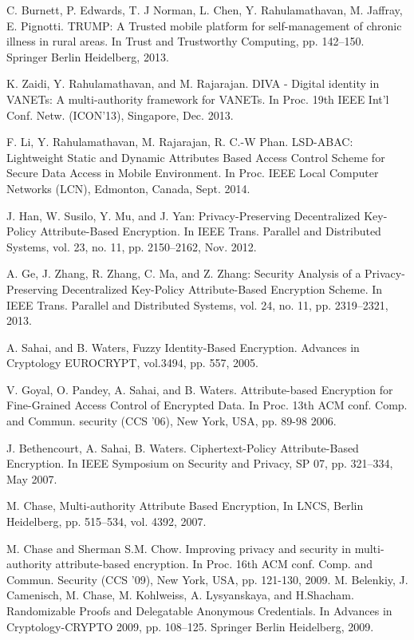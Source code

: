 \documentclass[10pt,journal]{IEEEtran}
\begin{document}
\begin{thebibliography}{5}
C. Burnett, P. Edwards, T. J Norman, L. Chen, Y. Rahulamathavan, M. Jaffray, E. Pignotti. TRUMP: A Trusted mobile platform for self-management of chronic illness in rural areas. In Trust and Trustworthy Computing, pp. 142--150. Springer Berlin Heidelberg, 2013.

K. Zaidi, Y. Rahulamathavan, and M. Rajarajan. DIVA - Digital identity in VANETs: A multi-authority framework for VANETs. In Proc.  19th IEEE Int'l Conf. Netw. (ICON'13), Singapore, Dec. 2013.

F. Li, Y. Rahulamathavan, M. Rajarajan, R. C.-W Phan. LSD-ABAC: Lightweight Static and Dynamic Attributes Based Access Control Scheme for Secure Data Access in Mobile Environment. In Proc. IEEE Local Computer Networks (LCN), Edmonton, Canada, Sept. 2014.




J. Han, W. Susilo, Y. Mu, and J. Yan: Privacy-Preserving Decentralized Key-Policy Attribute-Based Encryption. In IEEE Trans. Parallel and Distributed Systems, vol. 23, no. 11, pp. 2150--2162, Nov. 2012.

A. Ge, J. Zhang, R. Zhang, C. Ma, and Z. Zhang: Security Analysis of a Privacy-Preserving Decentralized Key-Policy Attribute-Based Encryption Scheme. In IEEE Trans. Parallel and Distributed Systems, vol. 24, no. 11, pp. 2319--2321, 2013.



A. Sahai, and B. Waters, Fuzzy Identity-Based Encryption. Advances in Cryptology EUROCRYPT,  vol.3494, pp. 557, 2005.

V. Goyal, O. Pandey, A. Sahai, and B. Waters. Attribute-based Encryption for Fine-Grained Access Control of Encrypted Data. In Proc. 13th ACM conf. Comp. and Commun. security (CCS '06), New York, USA, pp. 89-98 2006.

J. Bethencourt, A. Sahai, B. Waters. Ciphertext-Policy Attribute-Based Encryption. In IEEE Symposium on Security and Privacy, SP 07, pp. 321--334, May 2007.

M. Chase, Multi-authority Attribute Based Encryption, In LNCS, Berlin Heidelberg,  pp. 515--534, vol. 4392, 2007.






M. Chase and Sherman S.M. Chow. Improving privacy and security in multi-authority attribute-based encryption. In Proc. 16th ACM conf. Comp. and Commun. Security (CCS '09), New York, USA, pp. 121-130, 2009.
 M. Belenkiy, J. Camenisch, M. Chase, M. Kohlweiss, A. Lysyanskaya, and H.Shacham. Randomizable Proofs and Delegatable
Anonymous Credentials. In Advances in Cryptology-CRYPTO 2009, pp. 108--125. Springer Berlin Heidelberg, 2009.






\end{thebibliography}
\end{document}
